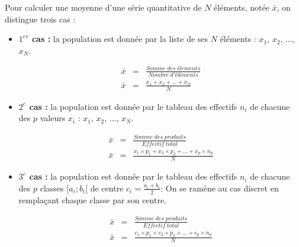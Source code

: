 \documentclass[12pt,a4paper]{article}
\begin{document}
  	\begin{mybilan}
  		  		
  		Pour calculer une moyenne d'une série quantitative de $N$ éléments, notée $\bar{x}$, on distingue trois cas :
  		
  		\begin{itemize}
  			\item \textbf{$1^{er}$ cas :} la population est donnée par la liste de ses $N$ éléments : $x_1$, $x_2$, ..., $x_N$.
  			
  			\begin{eqnarray*}
  				\bar{x} &= & \frac{Somme\; des \; élements}{Nombre\; d'éléments}\\
  				\bar{x} &= & \frac{x_1 + x_2 + ... + x_N}{N}
  			\end{eqnarray*}
  		
  			\item \textbf{$2^{e}$ cas :} la population est donnée par le tableau des effectifs $n_i$ de chacune des $p$ valeurs $x_i$ : $x_1$, $x_2$, ..., $x_N$.
  			
  			\begin{eqnarray*}
  				\bar{x} &= & \frac{Somme\; des \; produits}{Effectif\; total}\\
  				\bar{x} &= & \frac{x_1 \times p_1 + x_2 \times p_2 + ... + x_p \times n_p}{N}
  			\end{eqnarray*}
  		
  			\item \textbf{$3^{e}$ cas :} la population est donnée par le tableau des effectifs $n_i$ de chacune des $p$ classes $[a_i; b_i[$ de centre $c_i = \frac{a_i +  b_i}{2} $: On se ramène au cas discret en remplaçant chaque classe par son centre.
  			
  			\begin{eqnarray*}
  				\bar{x} &= & \frac{Somme\; des \; produits}{Effectif\; total}\\
  				\bar{x} &= & \frac{c_1 \times p_1 + c_2 \times p_2 + ... + c_p \times n_p}{N}
  			\end{eqnarray*}
  		
  		\end{itemize}
  	\end{mybilan}
\end{document}
